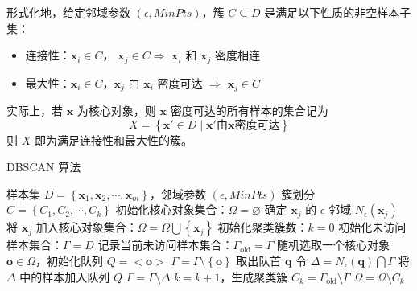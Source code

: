 形式化地，给定邻域参数 $(\epsilon, MinPts)$，簇 $C \subseteq D$ 是满足以下性质的非空样本子集：
\begin{itemize}
    \item 连接性：$\boldsymbol{x}_i \in C$，
    $\boldsymbol{x}_j \in C \Longrightarrow$ $\boldsymbol{x}_i$ 和 $\boldsymbol{x}_j$ 密度相连
    \item 最大性：$\boldsymbol{x}_i \in C$，$\boldsymbol{x}_j$ 
    由 $\boldsymbol{x}_i$ 密度可达 $\Longrightarrow$ $\boldsymbol{x}_j \in C$

\end{itemize}

实际上，若 $\boldsymbol{x}$ 为核心对象，则 $\boldsymbol{x}$ 密度可达的所有样本的集合记为 
\begin{equation}
    X = \left\{\boldsymbol{x}' \in D \mid \boldsymbol{x}' \text{由}\boldsymbol{x}\text{密度可达}\right\}
\end{equation}
则 $X$ 即为满足连接性和最大性的簇。

\begin{algorithm}[H]
    \renewcommand{\algorithmicrequire}{\textbf{Input:}}
	\renewcommand{\algorithmicensure}{\textbf{Output:}}
    \caption{DBSCAN 算法}
    \begin{algorithmic}[1]
        \REQUIRE 样本集 $D = \left\{\boldsymbol{x}_1, \boldsymbol{x}_2, \cdots, \boldsymbol{x}_m\right\}$，邻域参数 $(\epsilon, MinPts)$
        \ENSURE 簇划分 $C = \left\{C_1, C_2, \cdots, C_k\right\}$
        \STATE 初始化核心对象集合：$\Omega = \varnothing$
            \STATE 确定 $\boldsymbol{x}_j$ 的 $\epsilon$-邻域 $N_\epsilon(\boldsymbol{x}_j)$
                \STATE 将 $\boldsymbol{x}_j$ 加入核心对象集合：$\Omega = \Omega \bigcup \left\{\boldsymbol{x}_j\right\}$
            \ENDIF
        \ENDFOR
        \STATE 初始化聚类簇数：$k=0$
        \STATE 初始化未访问样本集合：$\Gamma = D$
        \WHILE{$\Omega \neq \varnothing$}
            \STATE 记录当前未访问样本集合：$\Gamma_{\text{old}} = \Gamma$
            \STATE 随机选取一个核心对象 $\boldsymbol{o} \in \Omega$，初始化队列 $Q = <\boldsymbol{o}>$
            \STATE $\Gamma = \Gamma \setminus \left\{\boldsymbol{o}\right\}$
                \STATE 取出队首 $\boldsymbol{q}$
                    \STATE 令 $\Delta = N_\epsilon(\boldsymbol{q}) \bigcap \Gamma$
                    \STATE 将 $\Delta$ 中的样本加入队列 $Q$
                    \STATE $\Gamma = \Gamma \setminus \Delta$
                \ENDIF
            \ENDWHILE
            \STATE $k = k+1$，生成聚类簇 $C_k = \Gamma_{\text{old}} \setminus \Gamma$
            \STATE $\Omega = \Omega \setminus C_k$
        \ENDWHILE
    \end{algorithmic}
\end{algorithm}

